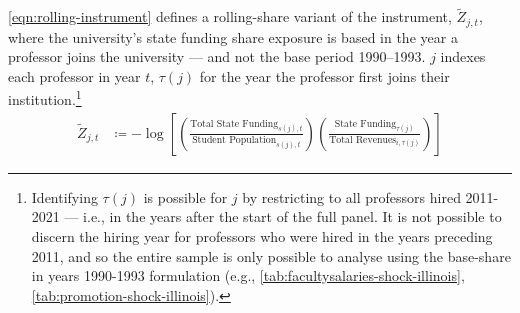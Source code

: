 \autoref{eqn:rolling-instrument} defines a rolling-share variant of the instrument, $\tilde Z_{j,t}$, where the university's state funding share exposure is based in the year a professor joins the university --- and not the base period 1990--1993.
$j$ indexes each professor in year $t$, $\tau(j)$ for the year the professor first joins their institution.\footnote{
    Identifying $\tau(j)$ is possible for $j$ by restricting to all professors hired 2011-2021 --- i.e., in the years after the start of the full panel.
    It is not possible to discern the hiring year for professors who  were hired in the years preceding 2011, and so the entire sample is only possible to analyse using the base-share in years 1990-1993 formulation (e.g., \autoref{tab:facultysalaries-shock-illinois}, \ref{tab:promotion-shock-illinois}).
}
\begin{align}
    \label{eqn:rolling-instrument}
    \tilde Z_{j,t} &\coloneqq - \log \left[
    \left( \frac{\text{Total State Funding}_{s(j),t}}{\text{Student Population}_{s(j),t}} \right)
    \left( \frac{\text{State Funding}_{\tau(j)}}{\text{Total Revenues}_{i,\tau(j)}} \right) \right]
\end{align}

